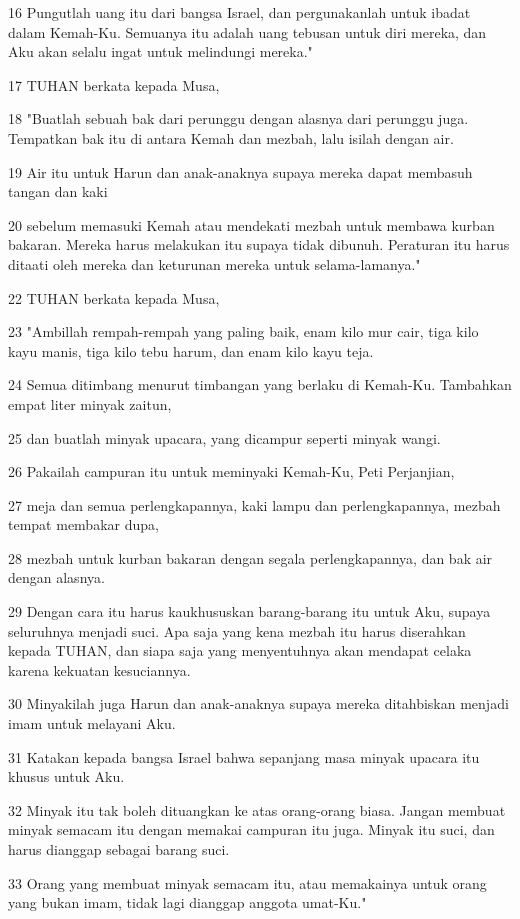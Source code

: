 \par 16 Pungutlah uang itu dari bangsa Israel, dan pergunakanlah untuk ibadat dalam Kemah-Ku. Semuanya itu adalah uang tebusan untuk diri mereka, dan Aku akan selalu ingat untuk melindungi mereka."
\par 17 TUHAN berkata kepada Musa,
\par 18 "Buatlah sebuah bak dari perunggu dengan alasnya dari perunggu juga. Tempatkan bak itu di antara Kemah dan mezbah, lalu isilah dengan air.
\par 19 Air itu untuk Harun dan anak-anaknya supaya mereka dapat membasuh tangan dan kaki
\par 20 sebelum memasuki Kemah atau mendekati mezbah untuk membawa kurban bakaran. Mereka harus melakukan itu supaya tidak dibunuh. Peraturan itu harus ditaati oleh mereka dan keturunan mereka untuk selama-lamanya."
\par 22 TUHAN berkata kepada Musa,
\par 23 "Ambillah rempah-rempah yang paling baik, enam kilo mur cair, tiga kilo kayu manis, tiga kilo tebu harum, dan enam kilo kayu teja.
\par 24 Semua ditimbang menurut timbangan yang berlaku di Kemah-Ku. Tambahkan empat liter minyak zaitun,
\par 25 dan buatlah minyak upacara, yang dicampur seperti minyak wangi.
\par 26 Pakailah campuran itu untuk meminyaki Kemah-Ku, Peti Perjanjian,
\par 27 meja dan semua perlengkapannya, kaki lampu dan perlengkapannya, mezbah tempat membakar dupa,
\par 28 mezbah untuk kurban bakaran dengan segala perlengkapannya, dan bak air dengan alasnya.
\par 29 Dengan cara itu harus kaukhususkan barang-barang itu untuk Aku, supaya seluruhnya menjadi suci. Apa saja yang kena mezbah itu harus diserahkan kepada TUHAN, dan siapa saja yang menyentuhnya akan mendapat celaka karena kekuatan kesuciannya.
\par 30 Minyakilah juga Harun dan anak-anaknya supaya mereka ditahbiskan menjadi imam untuk melayani Aku.
\par 31 Katakan kepada bangsa Israel bahwa sepanjang masa minyak upacara itu khusus untuk Aku.
\par 32 Minyak itu tak boleh dituangkan ke atas orang-orang biasa. Jangan membuat minyak semacam itu dengan memakai campuran itu juga. Minyak itu suci, dan harus dianggap sebagai barang suci.
\par 33 Orang yang membuat minyak semacam itu, atau memakainya untuk orang yang bukan imam, tidak lagi dianggap anggota umat-Ku."
